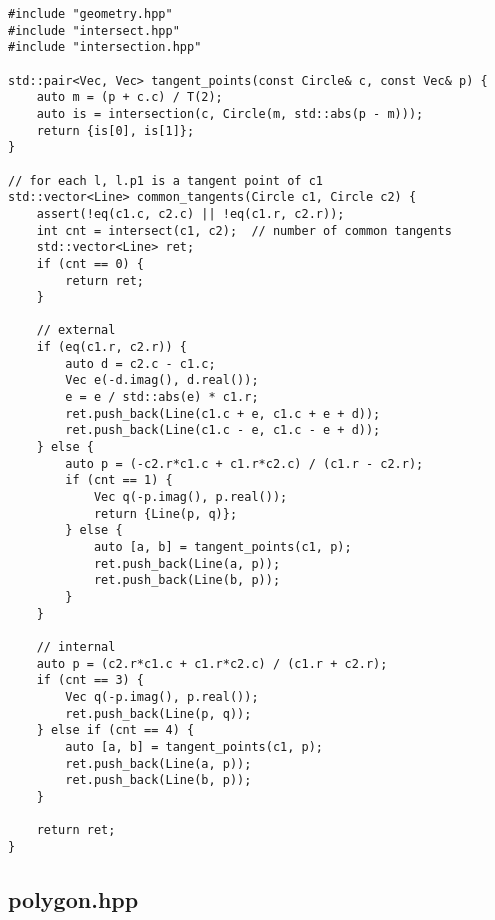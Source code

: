 \begin{lstlisting}
#include "geometry.hpp"
#include "intersect.hpp"
#include "intersection.hpp"

std::pair<Vec, Vec> tangent_points(const Circle& c, const Vec& p) {
    auto m = (p + c.c) / T(2);
    auto is = intersection(c, Circle(m, std::abs(p - m)));
    return {is[0], is[1]};
}

// for each l, l.p1 is a tangent point of c1
std::vector<Line> common_tangents(Circle c1, Circle c2) {
    assert(!eq(c1.c, c2.c) || !eq(c1.r, c2.r));
    int cnt = intersect(c1, c2);  // number of common tangents
    std::vector<Line> ret;
    if (cnt == 0) {
        return ret;
    }

    // external
    if (eq(c1.r, c2.r)) {
        auto d = c2.c - c1.c;
        Vec e(-d.imag(), d.real());
        e = e / std::abs(e) * c1.r;
        ret.push_back(Line(c1.c + e, c1.c + e + d));
        ret.push_back(Line(c1.c - e, c1.c - e + d));
    } else {
        auto p = (-c2.r*c1.c + c1.r*c2.c) / (c1.r - c2.r);
        if (cnt == 1) {
            Vec q(-p.imag(), p.real());
            return {Line(p, q)};
        } else {
            auto [a, b] = tangent_points(c1, p);
            ret.push_back(Line(a, p));
            ret.push_back(Line(b, p));
        }
    }

    // internal
    auto p = (c2.r*c1.c + c1.r*c2.c) / (c1.r + c2.r);
    if (cnt == 3) {
        Vec q(-p.imag(), p.real());
        ret.push_back(Line(p, q));
    } else if (cnt == 4) {
        auto [a, b] = tangent_points(c1, p);
        ret.push_back(Line(a, p));
        ret.push_back(Line(b, p));
    }

    return ret;
}

\end{lstlisting}

\subsection{polygon.hpp}

